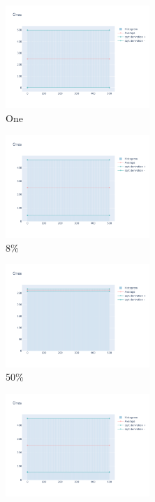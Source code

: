 \documentclass[12pt, fleqn]{report}                             %
\theoremstyle{break}                                            %
\begin{document}
      \begin{figure}[ht!]
        \centering
        \begin{subfigure}[b]{0.4\linewidth}
          \includegraphics[width=0.6\textwidth]{Images/27/dia-a.png}
          \caption{One}
        \end{subfigure}
        \begin{subfigure}[b]{0.4\linewidth}
          \includegraphics[width=0.6\textwidth]{Images/27/dia-b.png}
          \caption{8\%}
        \end{subfigure}
        \begin{subfigure}[b]{0.4\linewidth}
          \includegraphics[width=0.6\textwidth]{Images/27/dia-c.png}
          \caption{50\%}
        \end{subfigure}
        \begin{subfigure}[b]{0.4\linewidth}
          \includegraphics[width=0.6\textwidth]{Images/27/dia-d.png}

\end{subfigure}
\end{figure}
\end{document}

